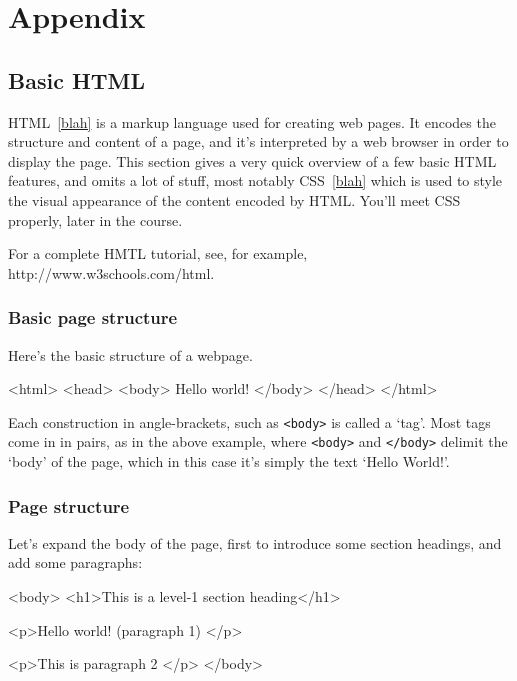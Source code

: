 \chapter{Appendix}


\section{Basic HTML}
\label{appendix:simplehtml}


HTML~\ref{blah} is a markup language used for creating web pages. It
encodes the structure and content of a page, and it's interpreted by a
web browser in order to display the page. This section gives a very
quick overview of a few basic HTML features, and omits a lot of stuff,
most notably CSS~\ref{blah} which is used to style the visual
appearance of the content encoded by HTML. You'll meet CSS properly,
later in the course.

For a complete HMTL tutorial, see, for example,
http://www.w3schools.com/html.

\subsection{Basic page structure}

Here's the basic structure of a webpage. 

\begin{ttoutenv}
<html>
<head>
<body>
Hello world!
</body>
</head>
</html>
\end{ttoutenv}

Each construction in angle-brackets, such as \verb|<body>| is called a
`tag'. Most tags come in in pairs, as in the above example, where
\verb|<body>| and \verb|</body>| delimit the `body' of the page, which
in this case it's simply the text `Hello World!'.

\subsection{Page structure}

Let's expand the body of the page, first to introduce some section
headings, and add some paragraphs:

\begin{ttoutenv}
<body>
<h1>This is a level-1 section heading</h1>

<p>Hello world! (paragraph 1) </p>

<p>This is paragraph 2 </p>
</body>
\end{ttoutenv}

